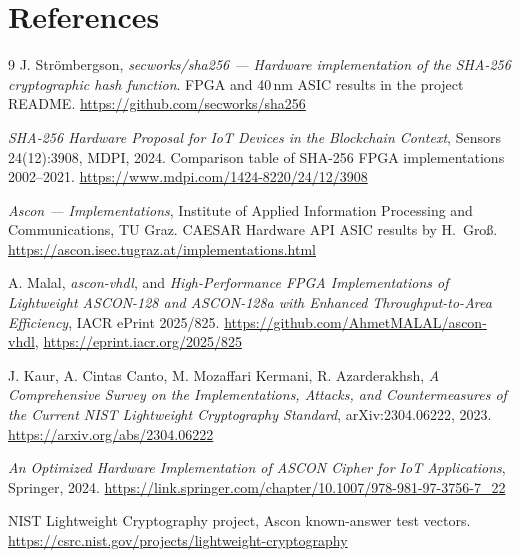\documentclass[11pt,a4paper]{article}
\begin{document}
\begin{center}
\end{center}

\section*{References}
\small
\begin{thebibliography}{9}
 J. Str\"ombergson, \emph{secworks/sha256 --- Hardware
implementation of the SHA-256 cryptographic hash function}. FPGA and 40\,nm
ASIC results in the project README.
\url{https://github.com/secworks/sha256}

 \emph{SHA-256 Hardware Proposal for IoT Devices in the
Blockchain Context}, Sensors 24(12):3908, MDPI, 2024. Comparison table of
SHA-256 FPGA implementations 2002--2021.
\url{https://www.mdpi.com/1424-8220/24/12/3908}

 \emph{Ascon --- Implementations}, Institute of Applied
Information Processing and Communications, TU Graz. CAESAR Hardware API ASIC
results by H.\ Gro\ss{}.
\url{https://ascon.isec.tugraz.at/implementations.html}

 A. Malal, \emph{ascon-vhdl}, and
\emph{High-Performance FPGA Implementations of Lightweight ASCON-128 and
ASCON-128a with Enhanced Throughput-to-Area Efficiency}, IACR ePrint 2025/825.
\url{https://github.com/AhmetMALAL/ascon-vhdl},
\url{https://eprint.iacr.org/2025/825}

 J. Kaur, A. Cintas Canto, M. Mozaffari Kermani,
R. Azarderakhsh, \emph{A Comprehensive Survey on the Implementations, Attacks,
and Countermeasures of the Current NIST Lightweight Cryptography Standard},
arXiv:2304.06222, 2023. \url{https://arxiv.org/abs/2304.06222}

 \emph{An Optimized Hardware Implementation of ASCON Cipher
for IoT Applications}, Springer, 2024.
\url{https://link.springer.com/chapter/10.1007/978-981-97-3756-7_22}

 NIST Lightweight Cryptography project, Ascon known-answer test
vectors. \url{https://csrc.nist.gov/projects/lightweight-cryptography}
\end{thebibliography}
\end{document}

